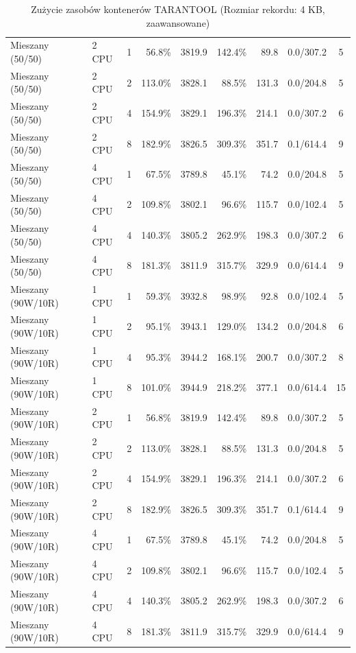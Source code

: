 \begin{table}[ht]
{\begin{tabular}{llcrrrrcc}
Mieszany (50/50) & 2 CPU & 1 & 56.8\% & 3819.9 & 142.4\% & 89.8 & 0.0/307.2 & 5 \\
Mieszany (50/50) & 2 CPU & 2 & 113.0\% & 3828.1 & 88.5\% & 131.3 & 0.0/204.8 & 5 \\
Mieszany (50/50) & 2 CPU & 4 & 154.9\% & 3829.1 & 196.3\% & 214.1 & 0.0/307.2 & 6 \\
Mieszany (50/50) & 2 CPU & 8 & 182.9\% & 3826.5 & 309.3\% & 351.7 & 0.1/614.4 & 9 \\
Mieszany (50/50) & 4 CPU & 1 & 67.5\% & 3789.8 & 45.1\% & 74.2 & 0.0/204.8 & 5 \\
Mieszany (50/50) & 4 CPU & 2 & 109.8\% & 3802.1 & 96.6\% & 115.7 & 0.0/102.4 & 5 \\
Mieszany (50/50) & 4 CPU & 4 & 140.3\% & 3805.2 & 262.9\% & 198.3 & 0.0/307.2 & 6 \\
Mieszany (50/50) & 4 CPU & 8 & 181.3\% & 3811.9 & 315.7\% & 329.9 & 0.0/614.4 & 9 \\
Mieszany (90W/10R) & 1 CPU & 1 & 59.3\% & 3932.8 & 98.9\% & 92.8 & 0.0/102.4 & 5 \\
Mieszany (90W/10R) & 1 CPU & 2 & 95.1\% & 3943.1 & 129.0\% & 134.2 & 0.0/204.8 & 6 \\
Mieszany (90W/10R) & 1 CPU & 4 & 95.3\% & 3944.2 & 168.1\% & 200.7 & 0.0/307.2 & 8 \\
Mieszany (90W/10R) & 1 CPU & 8 & 101.0\% & 3944.9 & 218.2\% & 377.1 & 0.0/614.4 & 15 \\
Mieszany (90W/10R) & 2 CPU & 1 & 56.8\% & 3819.9 & 142.4\% & 89.8 & 0.0/307.2 & 5 \\
Mieszany (90W/10R) & 2 CPU & 2 & 113.0\% & 3828.1 & 88.5\% & 131.3 & 0.0/204.8 & 5 \\
Mieszany (90W/10R) & 2 CPU & 4 & 154.9\% & 3829.1 & 196.3\% & 214.1 & 0.0/307.2 & 6 \\
Mieszany (90W/10R) & 2 CPU & 8 & 182.9\% & 3826.5 & 309.3\% & 351.7 & 0.1/614.4 & 9 \\
Mieszany (90W/10R) & 4 CPU & 1 & 67.5\% & 3789.8 & 45.1\% & 74.2 & 0.0/204.8 & 5 \\
Mieszany (90W/10R) & 4 CPU & 2 & 109.8\% & 3802.1 & 96.6\% & 115.7 & 0.0/102.4 & 5 \\
Mieszany (90W/10R) & 4 CPU & 4 & 140.3\% & 3805.2 & 262.9\% & 198.3 & 0.0/307.2 & 6 \\
Mieszany (90W/10R) & 4 CPU & 8 & 181.3\% & 3811.9 & 315.7\% & 329.9 & 0.0/614.4 & 9 \\
\bottomrule
\end{tabular}%
}
\caption{Zużycie zasobów kontenerów TARANTOOL (Rozmiar rekordu: 4 KB, zaawansowane)}
\label{tab:resources_tarantool_medium_0}
\end{table}
